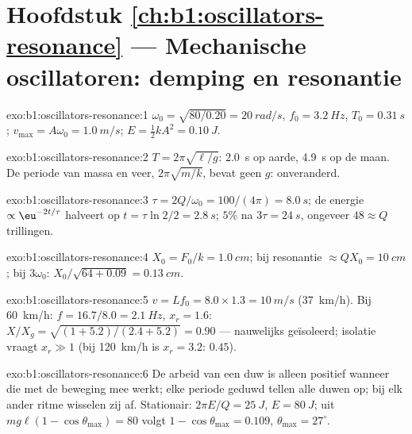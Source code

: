 \section*{Hoofdstuk \ref{ch:b1:oscillators-resonance} --- Mechanische oscillatoren: demping en resonantie}

\begin{solution}{exo:b1:oscillators-resonance:1}
$\omega_0 = \sqrt{80/0.20} = \qty{20}{rad/s}$, $f_0 = \qty{3.2}{Hz}$, $T_0 =
\qty{0.31}{s}$; $v_{\max} = A\omega_0 = \qty{1.0}{m/s}$; $E = \tfrac12 kA^2 =
\qty{0.10}{J}$.
\end{solution}

\begin{solution}{exo:b1:oscillators-resonance:2}
$T = 2\pi\sqrt{\ell/g}$: \qty{2.0}{s} op aarde, \qty{4.9}{s} op de maan.
De periode van massa en veer, $2\pi\sqrt{m/k}$, bevat geen $g$:
onveranderd.
\end{solution}

\begin{solution}{exo:b1:oscillators-resonance:3}
$\tau = 2Q/\omega_0 = 100/(4\pi) = \qty{8.0}{s}$; de energie $\propto \eu^{-2t/\tau}$
halveert op $t = \tau\ln2/2 = \qty{2.8}{s}$; $5\%$ na $3\tau = \qty{24}{s}$,
ongeveer $48 \approx Q$ trillingen.
\end{solution}

\begin{solution}{exo:b1:oscillators-resonance:4}
$X_0 = F_0/k = \qty{1.0}{cm}$; bij resonantie $\approx QX_0 = \qty{10}{cm}$;
bij $3\omega_0$: $X_0/\sqrt{64 + 0.09} = \qty{0.13}{cm}$.
\end{solution}

\begin{solution}{exo:b1:oscillators-resonance:5}
$v = Lf_0 = 8.0 \times 1.3 = \qty{10}{m/s}$ (\qty{37}{km/h}). Bij
\qty{60}{km/h}: $f = 16.7/8.0 = \qty{2.1}{Hz}$, $x_r = 1.6$: $X/X_g =
\sqrt{(1 + 5.2)/(2.4 + 5.2)} = 0.90$ --- nauwelijks geïsoleerd; isolatie
vraagt $x_r \gg 1$ (bij \qty{120}{km/h} is $x_r = 3.2$: $0.45$).
\end{solution}

\begin{solution}{exo:b1:oscillators-resonance:6}
De arbeid van een duw is alleen positief wanneer die met de beweging mee werkt;
elke periode geduwd tellen alle duwen op; bij elk ander ritme
wisselen zij af. Stationair: $2\pi E/Q = \qty{25}{J}$, $E = \qty{80}{J}$;
uit $mg\ell(1 - \cos\theta_{\max}) = 80$ volgt $1 - \cos\theta_{\max} = 0.109$,
$\theta_{\max} = 27^\circ$.
\end{solution}

